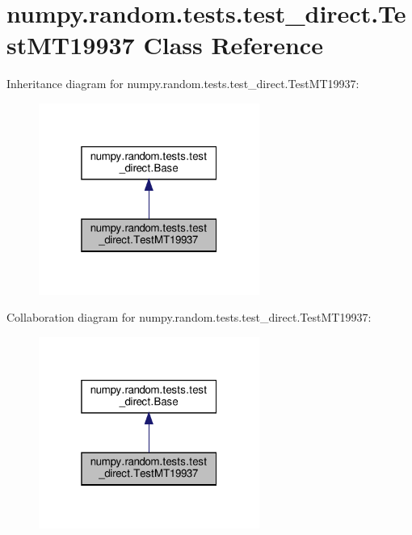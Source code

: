\hypertarget{classnumpy_1_1random_1_1tests_1_1test__direct_1_1TestMT19937}{}\section{numpy.\+random.\+tests.\+test\+\_\+direct.\+Test\+M\+T19937 Class Reference}
\label{classnumpy_1_1random_1_1tests_1_1test__direct_1_1TestMT19937}


Inheritance diagram for numpy.\+random.\+tests.\+test\+\_\+direct.\+Test\+M\+T19937\+:
\nopagebreak
\begin{figure}[H]
\begin{center}
\leavevmode
\includegraphics[width=205pt]{classnumpy_1_1random_1_1tests_1_1test__direct_1_1TestMT19937__inherit__graph}
\end{center}
\end{figure}


Collaboration diagram for numpy.\+random.\+tests.\+test\+\_\+direct.\+Test\+M\+T19937\+:
\nopagebreak
\begin{figure}[H]
\begin{center}
\leavevmode
\includegraphics[width=205pt]{classnumpy_1_1random_1_1tests_1_1test__direct_1_1TestMT19937__coll__graph}
\end{center}
\end{figure}
